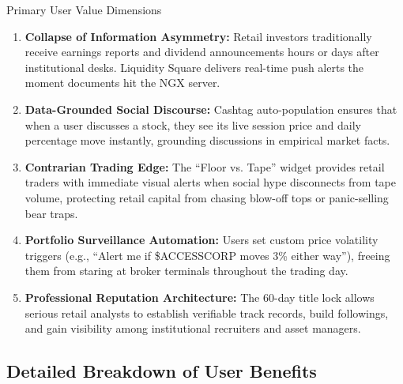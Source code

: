 \documentclass[11pt,a4paper]{article}
\begin{document}
\begin{benefitbox}{Primary User Value Dimensions}
\begin{enumerate}
    \item \textbf{Collapse of Information Asymmetry:} Retail investors traditionally receive earnings reports and dividend announcements hours or days after institutional desks. Liquidity Square delivers real-time push alerts the moment documents hit the NGX server.
    \item \textbf{Data-Grounded Social Discourse:} Cashtag auto-population ensures that when a user discusses a stock, they see its live session price and daily percentage move instantly, grounding discussions in empirical market facts.
    \item \textbf{Contrarian Trading Edge:} The ``Floor vs. Tape'' widget provides retail traders with immediate visual alerts when social hype disconnects from tape volume, protecting retail capital from chasing blow-off tops or panic-selling bear traps.
    \item \textbf{Portfolio Surveillance Automation:} Users set custom price volatility triggers (e.g., ``Alert me if \$ACCESSCORP moves 3\% either way''), freeing them from staring at broker terminals throughout the trading day.
    \item \textbf{Professional Reputation Architecture:} The 60-day title lock allows serious retail analysts to establish verifiable track records, build followings, and gain visibility among institutional recruiters and asset managers.
\end{enumerate}
\end{benefitbox}

\subsection{Detailed Breakdown of User Benefits}
\end{document}
